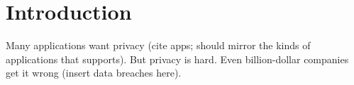 \section{Introduction}

%
%
%
%


Many applications want privacy (cite apps; should mirror the kinds of applications 
that \name supports).
But privacy is hard.
Even billion-dollar companies get it wrong (insert data breaches here).

